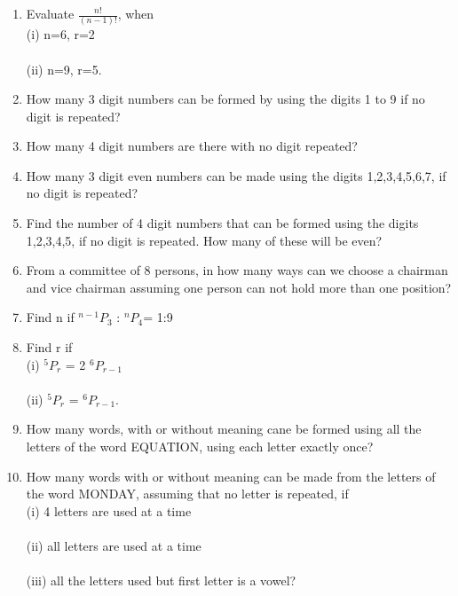 \begin{enumerate}[label=\arabic*.,ref=\thesubsection.\theenumi]
\item Evaluate $\frac{n!}{(n-1)!}$, when\\
(i) n=6, r=2\\
\\(ii) n=9, r=5.\\

\item How many 3 digit numbers can be formed by using the digits 1 to 9 if no digit is repeated?\\

\item How many 4 digit numbers are there with no digit repeated?\\

\item How many 3 digit even numbers can be made using the digits 1,2,3,4,5,6,7, if no digit is repeated?\\

\item Find the number of 4 digit numbers that can be formed using the digits 1,2,3,4,5, if no digit is repeated. How many of these will be even?\\

\item From a committee of 8 persons, in how many ways can we choose a chairman and vice chairman assuming one person can not hold more than one position?\\

\item Find n if $^{n-1}P_3$  : $^nP_4 $= 1:9\\

\item Find r if\\
(i) $^5P_r $ = 2 $^6P_{r-1}$\\
\\(ii) $^5P_r $ = $^6P_{r-1} .$\\

\item How many words, with or without meaning cane be formed using all the letters of the word EQUATION, using each letter exactly once?\\

\item How many words with or without meaning can be made from the letters of the word MONDAY, assuming that no letter is repeated, if\\
(i) 4 letters are used at a time\\
\\(ii) all letters are used at a time\\
\\(iii) all the letters used but first letter is a vowel?\\


\end{enumerate}
